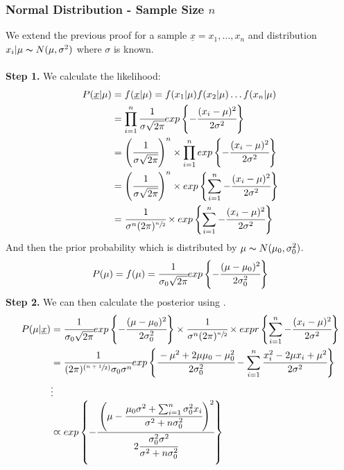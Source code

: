 \documentclass{report}
\begin{document}
            \subsubsection*{Normal Distribution - Sample Size $n$}
                We extend the previous proof for a sample $\underline{x} = x_1, \dots, x_n$ and distribution $x_i|\mu \thicksim N(\mu, \sigma^2)$ where $\sigma$ is known.
                \\
                \\ \textbf{Step 1.} We calculate the likelihood:
                \[\begin{split}
                    P(\underline{x}|\mu) &= f(\underline{x}|\mu) = f(x_1|\mu)f(x_2|\mu) \dots f(x_n|\mu)\\
                    &= \prod_{i=1}^n \cfrac{1}{\sigma \sqrt{2 \pi}} exp\left\{ -\cfrac{(x_i - \mu)^2}{2\sigma^2}\right\} \\
                    &= \left( \cfrac{1}{\sigma \sqrt{2 \pi}} \right)^n \times  \prod_{i=1}^n  exp\left\{ -\cfrac{(x_i - \mu)^2}{2\sigma^2}\right\} \\
                    &= \left( \cfrac{1}{\sigma \sqrt{2 \pi}} \right)^n \times  exp\left\{ \sum_{i=1}^n -\cfrac{(x_i - \mu)^2}{2\sigma^2}\right\} \\
                    &= \cfrac{1}{\sigma^n (2 \pi)^{\sfrac{n}{2}}} \times  exp\left\{ \sum_{i=1}^n -\cfrac{(x_i - \mu)^2}{2\sigma^2}\right\} \\
                \end{split}\]
                And then the prior probability which is distributed by $\mu \thicksim N(\mu_0, \sigma^2_0)$.
                \[P(\mu) = f(\mu) = \cfrac{1}{\sigma_0 \sqrt{2 \pi}} exp \left\{ -\cfrac{(\mu - \mu_0)^2}{2\sigma_0^2} \right\}\]
                \textbf{Step 2.} We can then calculate the posterior using  .
                \[\begin{split}
                    P(\mu|\underline{x}) &= \cfrac{1}{\sigma_0 \sqrt{2 \pi}} exp \left\{ -\cfrac{(\mu - \mu_0)^2}{2\sigma_0^2} \right\} \times \cfrac{1}{\sigma^n (2 \pi)^{\sfrac{n}{2}}} \times  expr\left\{ \sum_{i=1}^n -\cfrac{(x_i - \mu)^2}{2\sigma^2}\right\} \\
                    &= \cfrac{1}{(2 \pi)^{(\sfrac{n+1}{2})} \sigma_0 \sigma^n } exp \left\{ \cfrac{-\mu^2 + 2 \mu\mu_0 - \mu_0^2}{2\sigma^2_0} - \sum_{i=1}^n \cfrac{x_i^2 - 2\mu x_i + \mu^2}{2 \sigma^2} \right\} \\
                    & \vdots \\
                    & \varpropto exp \left\{ - \cfrac{\left(\mu - \cfrac{\mu_0 \sigma^2 + \sum_{i=1}^n \sigma_0^2x_i}{\sigma^2 + n \sigma^2_0}\right)^2}{2 \cfrac{\sigma_0^2\sigma^2}{\sigma^2 + n\sigma^2_0}} \right\}
                \end{split}\]
\end{document}
